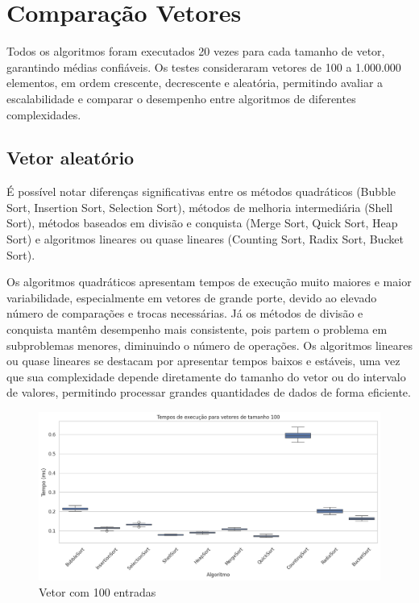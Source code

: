 \documentclass[
	article,			%
	11pt,				%
	oneside,			%
	a4paper,			%
	english,			%
	brazil,				%
	sumario=tradicional
	]{abntex2}
\begin{document}
\section{Comparação Vetores}
Todos os algoritmos foram executados 20 vezes para cada tamanho de vetor, garantindo médias confiáveis. Os testes consideraram vetores de 100 a 1.000.000 elementos, em ordem crescente, decrescente e aleatória, permitindo avaliar a escalabilidade e comparar o desempenho entre algoritmos de diferentes complexidades.

\subsection{Vetor aleatório}
É possível notar diferenças significativas entre os métodos quadráticos (Bubble Sort, Insertion Sort, Selection Sort), métodos de melhoria intermediária (Shell Sort), métodos baseados em divisão e conquista (Merge Sort, Quick Sort, Heap Sort) e algoritmos lineares ou quase lineares (Counting Sort, Radix Sort, Bucket Sort).

Os algoritmos quadráticos apresentam tempos de execução muito maiores e maior variabilidade, especialmente em vetores de grande porte, devido ao elevado número de comparações e trocas necessárias. Já os métodos de divisão e conquista mantêm desempenho mais consistente, pois partem o problema em subproblemas menores, diminuindo o número de operações. Os algoritmos lineares ou quase lineares se destacam por apresentar tempos baixos e estáveis, uma vez que sua complexidade depende diretamente do tamanho do vetor ou do intervalo de valores, permitindo processar grandes quantidades de dados de forma eficiente.

\begin{figure}[h!]
    \centering
    \includegraphics[width=1\linewidth]{Tempo100.png}
    \caption{Vetor com 100 entradas}
    \label{fig:placeholder}
\end{figure}
\end{document}
